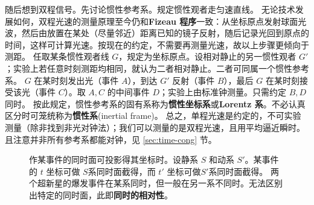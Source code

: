 随后想到双程信号。先讨论惯性参考系。规定惯性观者走匀速直线。
无论技术发展如何，双程光速的测量原理至今仍和\textbf{Fizeau 程序}一致：从坐标原点发射球面光波，然后由放置在某处（尽量邻近）距离已知的镜子反射，随后记录光回到原点的时间，这样可计算光速。按现在的约定，不需要再测量光速，故以上步骤更倾向于测距。
任取某条惯性观者线 $G$，规定为坐标原点。设相对静止的另一惯性观者 $G'$；实验上若任意时刻测距均相同，就认为二者相对静止。二者可同属一个惯性参考系。
$G$ 在某时刻发出光（事件 $A$），到达 $G'$ 反射（事件 $B$），最后 $G$ 在某时刻接受该光（事件 $C$）。取 $A,C$ 的中间事件 $D$；实验上由标准钟测量。只需约定 $B,D$ 同时。
按此规定，惯性参考系的固有系称为\textbf{惯性坐标系}或\textbf{Lorentz 系}。不必认真区分时可笼统称为\textbf{惯性系}(inertial frame)。
总之，单程光速是约定的，不可实验测量（除非找到非光对钟法）；我们可以测量的是双程光速，且用平均逼近瞬时。
且注意并非所有参考系都能对钟，见 \ref{sec:time-cong} 节。

\begin{figure}[t]
    \centering
    \quad
    \caption{\small 作某事件的同时面可投影得其坐标时。设静系 $S$ 和动系 $S'$。某事件的 $t$ 坐标可做 $S$系同时面截得，而 $t'$ 坐标可做$S'$系同时面截得。
    两个超新星的爆发事件在某系同时，但一般在另一系不同时。无法区别出特定的同时面，此即\textbf{同时的相对性}。}
    \label{fig:simurela}
\end{figure}

